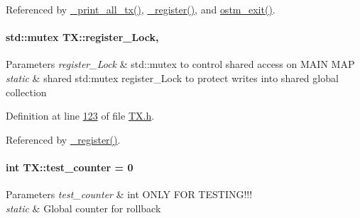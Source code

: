 Referenced by \hyperlink{_t_x_8cpp_source_l00346}{\+\_\+print\+\_\+all\+\_\+tx()}, \hyperlink{_t_x_8cpp_source_l00104}{\+\_\+register()}, and \hyperlink{_t_x_8cpp_source_l00072}{ostm\+\_\+exit()}.

\paragraph[{\texorpdfstring{register\+\_\+\+Lock}{register_Lock}}]{\setlength{\rightskip}{0pt plus 5cm}std\+::mutex T\+X\+::register\+\_\+\+Lock\hspace{0.3cm}{\ttfamily [static]}, {\ttfamily [private]}}\hypertarget{class_t_x_aa688a8c96fa3cdf8cd92e267463536dc_aa688a8c96fa3cdf8cd92e267463536dc}{}\label{class_t_x_aa688a8c96fa3cdf8cd92e267463536dc_aa688a8c96fa3cdf8cd92e267463536dc}

\begin{DoxyParams}{Parameters}
{\em register\+\_\+\+Lock} & std\+::mutex to control shared access on M\+A\+IN M\+AP\\
\hline
{\em static} & shared std\+:mutex register\+\_\+\+Lock to protect writes into shared global collection \\
\hline
\end{DoxyParams}


Definition at line \hyperlink{_t_x_8h_source_l00123}{123} of file \hyperlink{_t_x_8h_source}{T\+X.\+h}.



Referenced by \hyperlink{_t_x_8cpp_source_l00104}{\+\_\+register()}.

\paragraph[{\texorpdfstring{test\+\_\+counter}{test_counter}}]{\setlength{\rightskip}{0pt plus 5cm}int T\+X\+::test\+\_\+counter = 0\hspace{0.3cm}{\ttfamily [static]}}\hypertarget{class_t_x_a25838234aab99ae891a90eb8623a8b3c_a25838234aab99ae891a90eb8623a8b3c}{}\label{class_t_x_a25838234aab99ae891a90eb8623a8b3c_a25838234aab99ae891a90eb8623a8b3c}

\begin{DoxyParams}{Parameters}
{\em test\+\_\+counter} & int O\+N\+LY F\+OR T\+E\+S\+T\+I\+N\+G!!!\\
\hline
{\em static} & Global counter for rollback \\
\hline
\end{DoxyParams}


